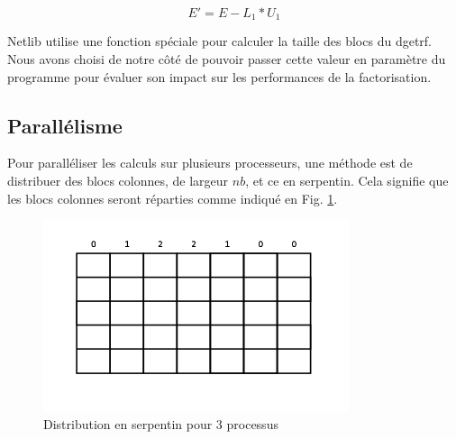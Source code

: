 \begin{equation}
\label{eq:dgemm}
E' = E - L_1 * U_1
\end{equation}

Netlib utilise une fonction spéciale pour calculer la taille des blocs du dgetrf. Nous avons choisi de notre côté de pouvoir passer cette valeur en paramètre du programme pour évaluer son impact sur les performances de la factorisation.

\subsection{Parallélisme} %
\label{sub:parallelisme}

Pour paralléliser les calculs sur plusieurs processeurs, une méthode est de distribuer des blocs colonnes, de largeur $nb$, et ce en serpentin. Cela signifie que les blocs colonnes seront réparties comme indiqué en Fig. \ref{fig:serpentin}.

\begin{figure}[H]
\centering
\includegraphics[width=0.8\textwidth]{serpentin}
\caption{Distribution en serpentin pour 3 processus}
\label{fig:serpentin}
\end{figure}


